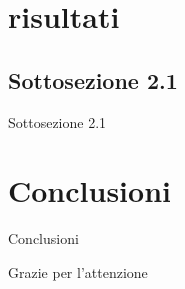 \documentclass[11pt]{beamer}
\begin{document}
\section{risultati} 
\subsection{Sottosezione 2.1}
\begin{frame}{Sottosezione 2.1}
\end{frame}

\section{Conclusioni}
\begin{frame}{Conclusioni}
\end{frame}

\begin{frame}
  \centering
  {\Huge Grazie per l'attenzione}
\end{frame}
\end{document}
